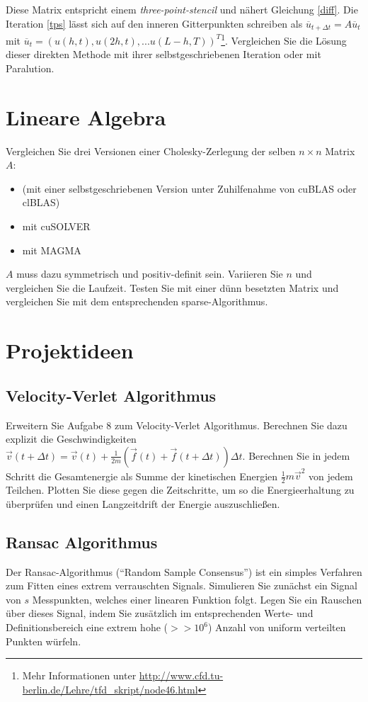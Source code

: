 \documentclass[headsepline=3pt,headinclude=true,12pt,oneside]{scrartcl}
\begin{document}
		Diese Matrix entspricht einem \textit{three-point-stencil} und nähert Gleichung \ref{diff}. Die Iteration \ref{tps} lässt sich auf den inneren Gitterpunkten schreiben als $\overline{u}_{t+\Delta t} = A\overline{u}_t$ mit $\overline{u}_t = (u(h,t), u(2h,t), ... u(L-h,T))^T$\footnote{Mehr Informationen unter \url{http://www.cfd.tu-berlin.de/Lehre/tfd_skript/node46.html}}. Vergleichen Sie die Lösung dieser direkten Methode mit ihrer selbstgeschriebenen Iteration oder mit Paralution. 
		
		\section{Lineare Algebra}
		Vergleichen Sie drei Versionen einer Cholesky-Zerlegung der selben $n\times n$ Matrix $A$:
		\begin{itemize}
			\item (mit einer selbstgeschriebenen Version unter Zuhilfenahme von cuBLAS oder clBLAS)
			\item mit cuSOLVER
			\item mit MAGMA
		\end{itemize}
		$A$ muss dazu symmetrisch und positiv-definit sein. Variieren Sie $n$ und vergleichen Sie die Laufzeit. Testen Sie mit einer dünn besetzten Matrix und vergleichen Sie mit dem entsprechenden sparse-Algorithmus. 
			
		
		\section{Projektideen}
			\subsection{Velocity-Verlet Algorithmus}
			Erweitern Sie Aufgabe 8 zum Velocity-Verlet Algorithmus. Berechnen Sie dazu explizit die Geschwindigkeiten $\vec{v}(t+\Delta t) = \vec{v}(t)+\frac{1}{2m}(\vec{f}(t)+\vec{f}(t+\Delta t))\Delta t$. Berechnen Sie in jedem Schritt die Gesamtenergie als Summe der kinetischen Energien $\frac12 m \vec{v}^2$ von jedem Teilchen. Plotten Sie diese gegen die Zeitschritte, um so die Energieerhaltung zu überprüfen und einen Langzeitdrift der Energie auszuschließen.
			
			\subsection{Ransac Algorithmus}
			Der Ransac-Algorithmus (\enquote{Random Sample Consensus}) ist ein simples Verfahren zum Fitten eines extrem verrauschten Signals. Simulieren Sie zunächst ein Signal von $s$ Messpunkten, welches einer linearen Funktion folgt. Legen Sie ein Rauschen über dieses Signal, indem Sie zusätzlich im entsprechenden Werte- und Definitionsbereich eine extrem hohe ($>>10^6$) Anzahl von uniform verteilten Punkten würfeln.
			
\end{document}
